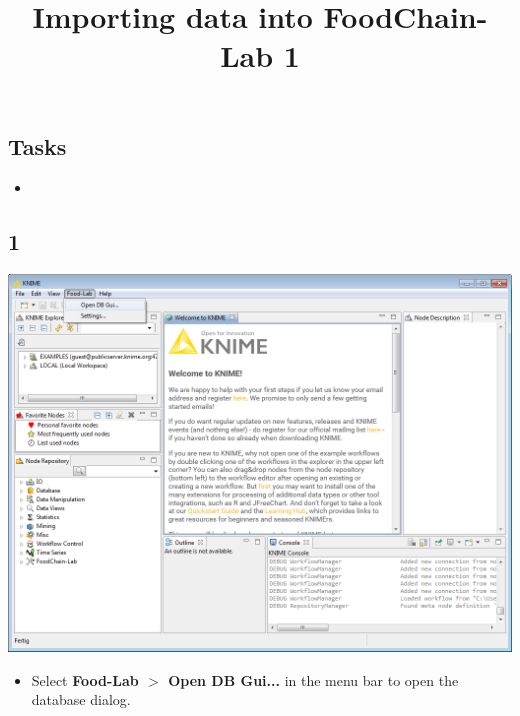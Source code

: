 \documentclass{beamer}
\title{Importing data into FoodChain-Lab 1}
\date{}
\begin{document}
\maketitle

\section{ }

\subsection{Tasks}
\begin{frame}
	\begin{itemize}
		\item
	\end{itemize}
\end{frame}
 
\subsection{1}
\begin{frame}
	\begin{center}
  		\includegraphics[height=0.6\textheight]{1.png}
	\end{center}
	\begin{itemize}
		\item Select \textbf{Food-Lab $>$ Open DB Gui...} in the menu bar to open the database dialog.
	\end{itemize}
\end{frame}
\end{document}
